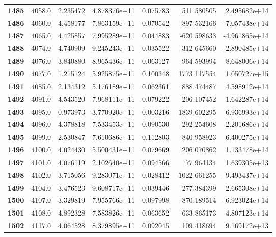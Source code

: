 \documentclass{report}[12pt]
\begin{document}
\begin{center}
\begin{tabular}{lrrrrrr}
\textbf{1485} &         4058.0 &   2.235472 &  4.878376e+11 &    0.075783 &   511.580505 &  2.495682e+14 \\
\textbf{1486} &         4060.0 &   4.458177 &  7.863159e+11 &    0.070542 &  -897.532166 & -7.057438e+14 \\
\textbf{1487} &         4065.0 &   4.425857 &  7.995289e+11 &    0.044883 &  -620.598633 & -4.961865e+14 \\
\textbf{1488} &         4074.0 &   4.740909 &  9.245243e+11 &    0.035522 &  -312.645660 & -2.890485e+14 \\
\textbf{1489} &         4076.0 &   3.840880 &  8.965436e+11 &    0.063127 &   964.593994 &  8.648006e+14 \\
\textbf{1490} &         4077.0 &   1.215124 &  5.925875e+11 &    0.100348 &  1773.117554 &  1.050727e+15 \\
\textbf{1491} &         4085.0 &   2.134312 &  5.176189e+11 &    0.062361 &   888.474487 &  4.598912e+14 \\
\textbf{1492} &         4091.0 &   4.543520 &  7.968111e+11 &    0.079222 &   206.107452 &  1.642287e+14 \\
\textbf{1493} &         4095.0 &   0.973973 &  3.770920e+11 &    0.003216 &  1839.602295 &  6.936993e+14 \\
\textbf{1494} &         4096.0 &   4.378818 &  7.533453e+11 &    0.090530 &   292.254608 &  2.201686e+14 \\
\textbf{1495} &         4099.0 &   2.530847 &  7.610686e+11 &    0.112803 &   840.958923 &  6.400275e+14 \\
\textbf{1496} &         4100.0 &   4.024430 &  5.500431e+11 &    0.079669 &   206.070862 &  1.133478e+14 \\
\textbf{1497} &         4101.0 &   4.076119 &  2.102640e+11 &    0.094566 &    77.964134 &  1.639305e+13 \\
\textbf{1498} &         4102.0 &   3.715056 &  9.283071e+11 &    0.028412 & -1022.661255 & -9.493437e+14 \\
\textbf{1499} &         4104.0 &   3.476523 &  9.608717e+11 &    0.039446 &   277.384399 &  2.665308e+14 \\
\textbf{1500} &         4107.0 &   3.329819 &  7.955766e+11 &    0.097998 &  -870.189514 & -6.923024e+14 \\
\textbf{1501} &         4108.0 &   4.892328 &  7.583826e+11 &    0.063652 &   633.865173 &  4.807123e+14 \\
\textbf{1502} &         4117.0 &   4.064528 &  8.379895e+11 &    0.092045 &   109.418694 &  9.169172e+13 \\

\end{tabular}
\end{center}
\end{document}
